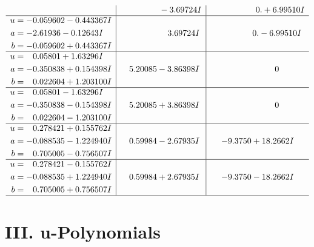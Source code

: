 \documentclass[1p]{elsarticle_modified}
\theoremstyle{definition}
\begin{document}
$$\begin{array}{c|c|c}
 & \phantom{-0.000000 } -3.69724 I & \phantom{-0.000000 -}0. + 6.99510 I \\ \hline\begin{aligned}
u &= -0.059602 - 0.443367 I \\
a &= -2.61936 - 0.12643 I \\
b &= -0.059602 + 0.443367 I\end{aligned}
 & \phantom{-0.000000 -}3.69724 I & \phantom{-0.000000 } 0. - 6.99510 I \\ \hline\begin{aligned}
u &= \phantom{-}0.05801 + 1.63296 I \\
a &= -0.350838 + 0.154398 I \\
b &= \phantom{-}0.022604 + 1.203100 I\end{aligned}
 & \phantom{-}5.20085 - 3.86398 I & \phantom{-0.000000 } 0 \\ \hline\begin{aligned}
u &= \phantom{-}0.05801 - 1.63296 I \\
a &= -0.350838 - 0.154398 I \\
b &= \phantom{-}0.022604 - 1.203100 I\end{aligned}
 & \phantom{-}5.20085 + 3.86398 I & \phantom{-0.000000 } 0 \\ \hline\begin{aligned}
u &= \phantom{-}0.278421 + 0.155762 I \\
a &= -0.088535 - 1.224940 I \\
b &= \phantom{-}0.705005 - 0.756507 I\end{aligned}
 & \phantom{-}0.59984 - 2.67935 I & -9.3750 + 18.2662 I \\ \hline\begin{aligned}
u &= \phantom{-}0.278421 - 0.155762 I \\
a &= -0.088535 + 1.224940 I \\
b &= \phantom{-}0.705005 + 0.756507 I\end{aligned}
 & \phantom{-}0.59984 + 2.67935 I & -9.3750 - 18.2662 I\\
 \hline 
 \end{array}$$\newpage
\newpage\renewcommand{\arraystretch}{1}
\centering \section*{ III. u-Polynomials}
\end{document}
